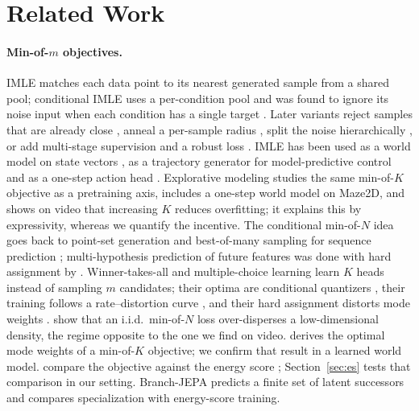 \section{Related Work}
\label{sec:related}

\paragraph{Min-of-$m$ objectives.}
IMLE \citep{li2018imle} matches each data point to its nearest generated sample from a shared pool; conditional IMLE uses a per-condition pool and was found to ignore its noise input when each condition has a single target \citep{li2019diverse,li2020multimodal}. Later variants reject samples that are already close \citep[RS-IMLE;][]{vashist2024rsimle}, anneal a per-sample radius \citep{aghabozorgi2023adaptive}, split the noise hierarchically \citep{peng2022chimle}, or add multi-stage supervision and a robust loss \citep[ROMS-IMLE;][]{vashist2026roms}. IMLE has been used as a world model on state vectors \citep{aghabozorgi2026wimle}, as a trajectory generator for model-predictive control \citep{lee2026imlempc} and as a one-step action head \citep{rana2025imlepolicy,hosseinkhani2026imlevla}. Explorative modeling \citep{gladstone2026xm} studies the same min-of-$K$ objective as a pretraining axis, includes a one-step world model on Maze2D, and shows on video that increasing $K$ reduces overfitting; it explains this by expressivity, whereas we quantify the incentive. The conditional min-of-$N$ idea goes back to point-set generation \citep{fan2017pointset} and best-of-many sampling for sequence prediction \citep{bhattacharyya2018bestofmany}; multi-hypothesis prediction of future features was done with hard assignment by \citet{vondrick2016anticipating}. Winner-takes-all and multiple-choice learning \citep{guzman2012mcl,lee2016smcl,rupprecht2017mhp,makansi2019ewta,seo2020tmcl} learn $K$ heads instead of sampling $m$ candidates; their optima are conditional quantizers \citep{rupprecht2017mhp,letzelter2024wta,delattre2025cdq,cortes2025timemcl}, their training follows a rate--distortion curve \citep{perera2024amcl}, and their hard assignment distorts mode weights \citep{wu2026wtagmm}. \citet{thiede2019variety} show that an i.i.d.\ min-of-$N$ loss over-disperses a low-dimensional density, the regime opposite to the one we find on video. \citet{bennett2026freedom} derives the optimal mode weights of a min-of-$K$ objective; we confirm that result in a learned world model. \citet{makabe2026esp} compare the objective against the energy score \citep{gneiting2007strictly}; Section~\ref{sec:es} tests that comparison in our setting. Branch-JEPA \citep{song2026branchjepa} predicts a finite set of latent successors and compares specialization with energy-score training.

